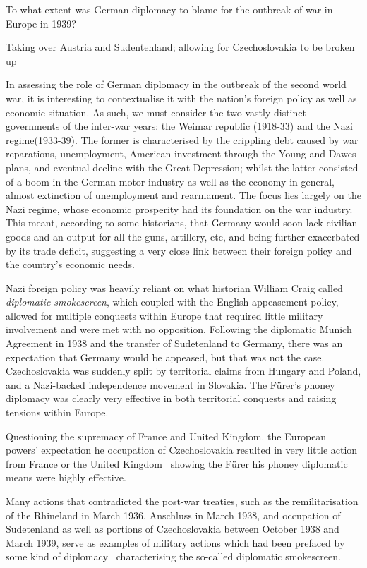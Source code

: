 \documentclass{article}
\begin{document}
To what extent was German diplomacy to blame for the outbreak of war in Europe in 1939?


Taking over Austria and Sudentenland; allowing for Czechoslovakia to be broken up



In assessing the role of German diplomacy in the outbreak of the second world war, it is interesting to contextualise it with the nation's foreign policy as well as economic situation. As such, we must consider the two vastly distinct governments of the inter-war years: the Weimar republic (1918-33) and the Nazi regime(1933-39). The former is characterised by the crippling debt caused by war reparations, unemployment, American investment through the Young and Dawes plans, and eventual decline with the Great Depression; whilst the latter consisted of a boom in the German motor industry as well as the economy in general, almost extinction of unemployment and rearmament. The focus lies largely on the Nazi regime, whose economic prosperity had its foundation on the war industry. This meant, according to some historians, that Germany would soon lack civilian goods and an output for all the guns, artillery, etc, and being further exacerbated by its trade deficit, suggesting a very close link between their foreign policy and the country's economic needs.

Nazi foreign policy was heavily reliant on what historian William Craig called \textit{diplomatic smokescreen}, which coupled with the English appeasement policy, allowed for multiple conquests within Europe that required little military involvement and were met with no opposition. Following the diplomatic Munich Agreement in 1938 and the transfer of Sudetenland to Germany, there was an expectation that Germany would be appeased, but that was not the case. Czechoslovakia was suddenly split by territorial claims from Hungary and Poland, and a Nazi-backed independence movement in Slovakia. The F\"{u}rer's phoney diplomacy was clearly very effective in both territorial conquests and raising tensions within Europe.

Questioning the supremacy of France and United Kingdom. the European powers' expectation he occupation of Czechoslovakia  resulted in very little action from France or the United Kingdom \textendash\ showing the F\"{u}rer his phoney diplomatic means were highly effective.

Many actions that contradicted the post-war treaties, such as the remilitarisation of the Rhineland in March 1936, Anschluss in March 1938, and occupation of Sudetenland as well as portions of Czechoslovakia between October 1938 and March 1939, serve as examples of military actions which had been prefaced by some kind of diplomacy \textendash\ characterising the so-called diplomatic smokescreen.
\end{document}
